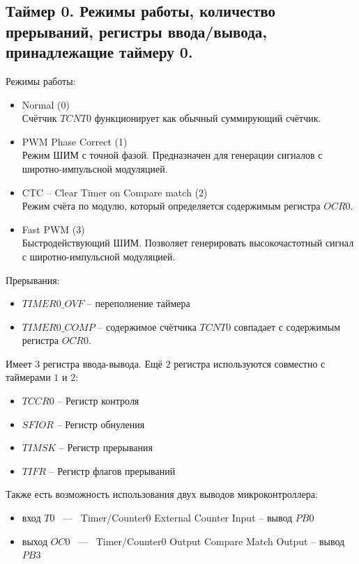 \subsection{Таймер 0. Режимы работы, количество прерываний, регистры ввода/вывода, принадлежащие таймеру 0.}

Режимы работы:
\begin{itemize}
  \item Normal (0)\\
  Счётчик $TCNT0$ функционирует как обычный суммирующий счётчик.
  \item PWM Phase Correct (1)\\
  Режим ШИМ с точной фазой. Предназначен для генерации сигналов с 
  широтно-импульсной модуляцией.
  \item CTC -- Clear Timer on Compare match (2)\\
  Режим счёта по модулю, который определяется содержимым регистра $OCR0$.
  \item Fast PWM (3) \\
  Быстродействующий ШИМ. Позволяет генерировать высокочастотный сигнал 
  с широтно-импульсной модуляцией.
\end{itemize}

Прерывания:
\begin{itemize}
  \item $TIMER0\_OVF$ -- переполнение таймера
  \item $TIMER0\_COMP$ -- содержимое счётчика $TCNT0$ совпадает с 
  содержимым регистра $OCR0$.
\end{itemize}

Имеет $3$ регистра ввода-вывода. Ещё $2$ регистра используются совместно 
с таймерами $1$ и $2$:
\begin{itemize}
  \item $TCCR0$ -- Регистр контроля
  \item $SFIOR$ -- Регистр обнуления
  \item $TIMSK$ -- Регистр прерывания
  \item $TIFR$ -- Регистр флагов прерываний
\end{itemize}

Также есть возможность использования двух выводов микроконтроллера:
\begin{itemize}
  \item вход $T0$ ~---~ Timer/Counter0 External Counter Input -- вывод $PB0$
  \item выход $OC0$ ~---~ Timer/Counter0 Output Compare Match Output -- вывод $PB3$
\end{itemize}


